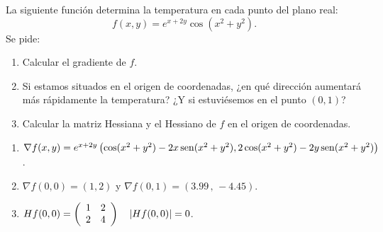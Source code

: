{La siguiente función determina la temperatura en cada punto del plano real:
\[f(x,y)=e^{x+2y}\cos(x^2+y^2).\]
Se pide:
\begin{enumerate}
  \item Calcular el gradiente de $f$.
  \item Si estamos situados en el origen de coordenadas, ¿en qué dirección aumentará más rápidamente la temperatura? ¿Y si estuviésemos en el punto $(0,1)$?
\item Calcular la matriz Hessiana y el Hessiano de $f$ en el origen de coordenadas.
\end{enumerate}
}
{\begin{enumerate}
\item $\nabla f(x,y) = e^{x+2y}\left(\cos(x^{2}+y^{2})-2x\operatorname{sen}(x^{2}+y^{2}), 2\cos(x^{2}+y^{2})-2y\operatorname{sen}(x^{2}+y^{2})\right)$.
\item $\nabla f(0,0) = (1,2)$ y $\nabla f(0,1) = (3.99\,,\,-4.45)$.
\item $Hf(0,0)=\left(
\begin{array}[]{cc}
1 & 2 \\
2 & 4
\end{array}
\right)
\quad |Hf(0,0)|= 0$.
\end{enumerate}
}
